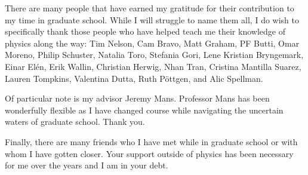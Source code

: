 There are many people that have earned my gratitude for their contribution to my time in graduate school.
While I will struggle to name them all, I do wish to specifically thank those people who have helped
teach me their knowledge of physics along the way:
Tim Nelson, Cam Bravo, Matt Graham, PF Butti, Omar Moreno, Philip Schuster, Natalia Toro, Stefania Gori,
Lene Kristian Bryngemark, Einar El\'{e}n, Erik Wallin, Christian Herwig, Nhan Tran, Cristina Mantilla Suarez,
Lauren Tompkins, Valentina Dutta, Ruth P{\"o}ttgen, and Alic Spellman.

Of particular note is my advisor Jeremy Mans.
Professor Mans has been wonderfully flexible as I have changed course while navigating the uncertain waters of graduate school.
Thank you.

Finally, there are many friends who I have met while in graduate school or with whom I have gotten closer.
Your support outside of physics has been necessary for me over the years and I am in your debt.

